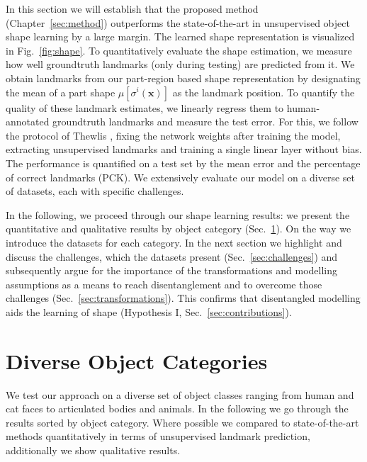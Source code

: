 	In this section we will establish that the proposed method (Chapter~\ref{sec:method}) outperforms the state-of-the-art in unsupervised object shape learning by a large margin.
	The learned shape representation is visualized in Fig.~\ref{fig:shape}. 
	To quantitatively evaluate the shape estimation, we measure how well groundtruth landmarks (only during testing) are predicted from it.
	We obtain landmarks from our part-region based shape representation by designating the mean of a part shape $\mu[\sigma^i(\mathbf{x})]$ as the landmark position. To quantify the quality of these landmark estimates, we linearly regress them to human-annotated groundtruth landmarks and measure the test error.
	For this, we follow the protocol of Thewlis \etal \cite{thewlis17}, fixing the network weights after training the model, extracting unsupervised landmarks and training a single linear layer without bias.
	The performance is quantified on a test set by the mean error and the percentage of correct landmarks (PCK).
	We extensively evaluate our model on a diverse set of datasets, each with specific challenges.


	In the following, we proceed through our shape learning results: we present the quantitative and qualitative {results} by object category (Sec.~\ref{sec:results}).
	On the way we introduce the datasets for each category.
	In the next section we highlight and discuss the challenges, which the datasets present (Sec.~\ref{sec:challenges}) and subsequently argue for the importance of the transformations and modelling assumptions  as a means to reach disentanglement and to overcome those challenges (Sec.~\ref{sec:transformations}).
	This confirms that disentangled modelling aids the learning of shape (Hypothesis I, Sec.~\ref{sec:contributions}).

\section{Diverse Object Categories}\label{sec:results}
	We test our approach on a diverse set of object classes ranging from human and cat faces to articulated bodies and animals. In the following we go through the results sorted by object category. Where possible we compared to state-of-the-art methods quantitatively in terms of unsupervised landmark prediction, additionally we show qualitative results.
